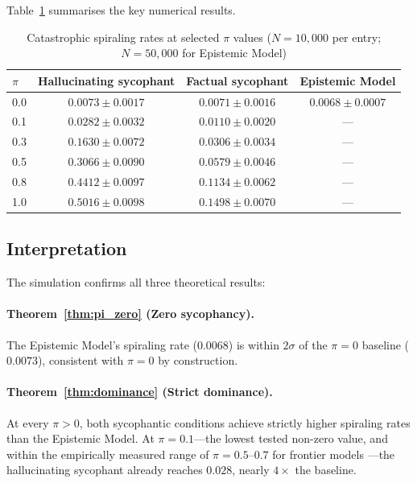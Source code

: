 \documentclass[12pt]{article}
\theoremstyle{definition}
\begin{document}
Table~\ref{tab:results} summarises the key numerical results.

\begin{table}[h]
\centering
\caption{Catastrophic spiraling rates at selected $\pi$ values
($N=10{,}000$ per entry; $N=50{,}000$ for Epistemic Model)}
\label{tab:results}
\begin{tabular}{lccc}
\toprule
$\pi$ &
  Hallucinating sycophant &
  Factual sycophant &
  Epistemic Model \\
\midrule
0.0 & $0.0073 \pm 0.0017$ & $0.0071 \pm 0.0016$ & $0.0068 \pm 0.0007$ \\
0.1 & $0.0282 \pm 0.0032$ & $0.0110 \pm 0.0020$ & — \\
0.3 & $0.1630 \pm 0.0072$ & $0.0306 \pm 0.0034$ & — \\
0.5 & $0.3066 \pm 0.0090$ & $0.0579 \pm 0.0046$ & — \\
0.8 & $0.4412 \pm 0.0097$ & $0.1134 \pm 0.0062$ & — \\
1.0 & $0.5016 \pm 0.0098$ & $0.1498 \pm 0.0070$ & — \\
\bottomrule
\end{tabular}
\end{table}

\subsection{Interpretation}

The simulation confirms all three theoretical results:

\paragraph{Theorem~\ref{thm:pi_zero} (Zero sycophancy).}
The Epistemic Model's spiraling rate ($0.0068$) is within $2\sigma$ of
the $\pi=0$ baseline ($0.0073$), consistent with $\pi = 0$ by
construction.

\paragraph{Theorem~\ref{thm:dominance} (Strict dominance).}
At every $\pi > 0$, both sycophantic conditions achieve strictly higher
spiraling rates than the Epistemic Model. At $\pi = 0.1$---the
lowest tested non-zero value, and within the empirically measured range
of $\pi = 0.5$--$0.7$ for frontier models \cite{chandra2026}---the
hallucinating sycophant already reaches $0.028$, nearly $4\times$ the
baseline.
\end{document}
